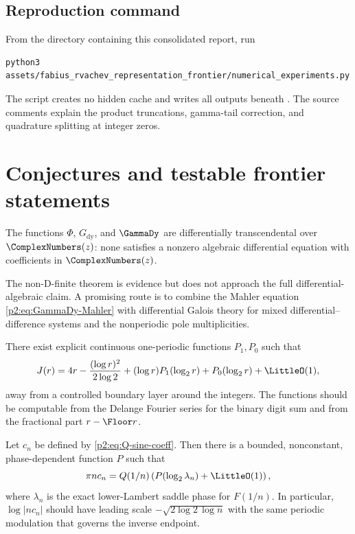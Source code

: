 \documentclass[11pt]{article}
\theoremstyle{definition}
\theoremstyle{remark}
\begin{document}
\subsection{Reproduction command}

From the directory containing this consolidated report, run
\begin{lstlisting}[style=pythonstyle]
python3 assets/fabius_rvachev_representation_frontier/numerical_experiments.py
\end{lstlisting}
The script creates no hidden cache and writes all outputs beneath
.  The source comments explain
the product truncations, gamma-tail correction, and quadrature splitting at integer zeros.

\section{Conjectures and testable frontier statements}
\label{p2:sec:conjectures}

\begin{conjecture}
The functions $\Phi$, $G_{\mathrm{dy}}$, and $\GammaDy$ are differentially transcendental
over $\ComplexNumbers(z)$: none satisfies a nonzero algebraic differential equation with coefficients in
$\ComplexNumbers(z)$.
\end{conjecture}

The non-D-finite theorem is evidence but does not approach the full differential-algebraic
claim.  A promising route is to combine the Mahler equation
\eqref{p2:eq:GammaDy-Mahler} with differential Galois theory for mixed differential--difference
systems and the nonperiodic pole multiplicities.

\begin{conjecture}
There exist explicit continuous one-periodic functions $P_1,P_0$ such that
\begin{equation}
 J(r)=4r-\frac{(\log r)^2}{2\log2}
      +(\log r)P_1(\log_2r)+P_0(\log_2r)+\LittleO(1),      \label{p2:eq:J-Delange-conj}
\end{equation}
away from a controlled boundary layer around the integers.  The functions should be
computable from the Delange Fourier series for the binary digit sum and from the fractional
part $r-\Floor r$.
\end{conjecture}

\begin{conjecture}
Let $c_n$ be defined by \eqref{p2:eq:Q-sine-coeff}.  Then there is a bounded, nonconstant,
phase-dependent function $P$ such that
\begin{equation}
 \pi n c_n
 =Q(1/n)\left(P(\log_2\lambda_n)+\LittleO(1)\right),      \label{p2:eq:cn-conj}
\end{equation}
where $\lambda_n$ is the exact lower-Lambert saddle phase for $F(1/n)$.  In particular,
$\log|nc_n|$ should have leading scale
$-\sqrt{2\log2\,\log n}$ with the same periodic modulation that governs the inverse endpoint.
\end{conjecture}
\end{document}
